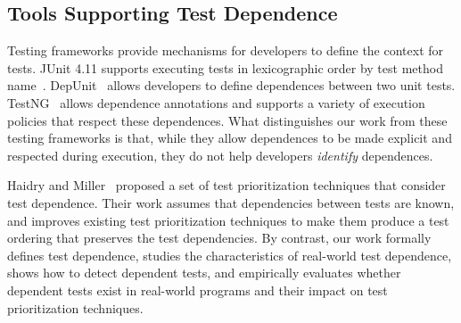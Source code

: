 

\subsection{Tools Supporting Test Dependence}
\label{sec:supporting}


Testing frameworks provide mechanisms
for developers to define the context for tests.
JUnit 4.11 supports
executing tests in lexicographic order by test method name~\cite{junitordering}.
%
DepUnit~\cite{depunit} allows developers to define
dependences between two unit tests.
TestNG~\cite{testng} 
allows dependence annotations and supports a variety of execution policies
that respect these dependences.
What distinguishes our work from these testing frameworks is that, while they allow dependences
to be made explicit and respected during execution, they do not help developers
\emph{identify} dependences.  

Haidry and Miller~\cite{10.1109/TSE.2012.26} proposed a set of
test prioritization techniques that consider
test dependence.  
Their work assumes that dependencies between tests are
known, and improves existing test prioritization techniques
to make them produce a test ordering that preserves the test dependencies.
By contrast, our work formally defines test dependence,
studies the characteristics of real-world test dependence,
shows how to detect dependent tests,
and empirically evaluates whether dependent tests exist in real-world
programs and
their impact on test prioritization techniques.


